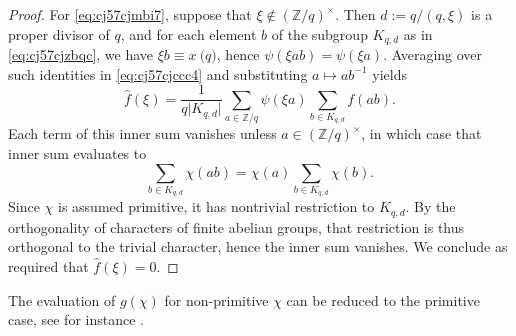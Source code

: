 \documentclass[reqno]{amsart}  \numberwithin{theorem}{section} \numberwithin{equation}{section}
\begin{document}
\begin{proof}
  For \eqref{eq:cj57cjmbi7}, suppose that $\xi \notin (\mathbb{Z} / q)^\times$.  Then $d := q / (q,\xi)$ is a proper divisor of $q$, and for each element $b$ of the subgroup $K_{q, d}$ as in \eqref{eq:cj57cjzbqc}, we have $\xi b \equiv x \pod{q}$, hence $\psi (\xi a b) = \psi (\xi a)$.  Averaging over such identities in \eqref{eq:cj57cjccc4} and substituting $a \mapsto a b^{-1} $ yields
  \begin{equation*}
    \hat{f} (\xi ) = \frac{1}{q \lvert K_{q, d} \rvert}
    \sum_{a \in \mathbb{Z} / q}
    \psi (\xi a)
    \sum_{b \in K_{q, d}}
    f (a b).
  \end{equation*}
  Each term of this inner sum vanishes unless $a \in (\mathbb{Z} / q)^\times$, in which case that inner sum evaluates to
  \begin{equation*}
    \sum_{b \in K_{q,d}} \chi (a b)
    =
    \chi (a) \sum_{b \in K_{q, d}} \chi (b).
  \end{equation*}
  Since $\chi$ is assumed primitive, it has nontrivial restriction to $K_{q,d}$.  By the orthogonality of characters of finite abelian groups, that restriction is thus orthogonal to the trivial character, hence the inner sum vanishes.  We conclude as required that $\hat{f} (\xi ) = 0$.
\end{proof}

\begin{remark}\label{remark:cj57ckegpb}
  The evaluation of $g(\chi)$ for non-primitive $\chi$ can be reduced to the primitive case, see for instance \cite[Lemma 3.1]{MR2061214}.
\end{remark}
{} 
\end{document}
